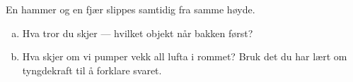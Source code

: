 %
En hammer og en fjær slippes samtidig fra samme høyde.
\begin{enumerate}[a)]
    \item Hva tror du skjer — hvilket objekt når bakken først?
    \item Hva skjer om vi pumper vekk all lufta i rommet? Bruk det du har lært om tyngdekraft til å forklare svaret.
\end{enumerate}

